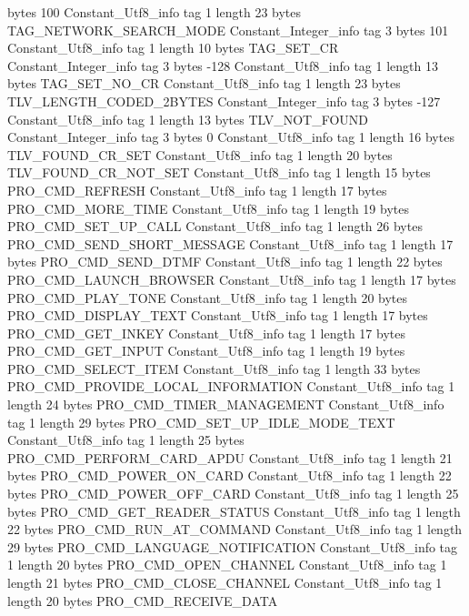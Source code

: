 {{{			bytes	100
		}
		Constant_Utf8_info {
			tag	1
			length	23
			bytes	TAG_NETWORK_SEARCH_MODE
		}
		Constant_Integer_info {
			tag	3
			bytes	101
		}
		Constant_Utf8_info {
			tag	1
			length	10
			bytes	TAG_SET_CR
		}
		Constant_Integer_info {
			tag	3
			bytes	-128
		}
		Constant_Utf8_info {
			tag	1
			length	13
			bytes	TAG_SET_NO_CR
		}
		Constant_Utf8_info {
			tag	1
			length	23
			bytes	TLV_LENGTH_CODED_2BYTES
		}
		Constant_Integer_info {
			tag	3
			bytes	-127
		}
		Constant_Utf8_info {
			tag	1
			length	13
			bytes	TLV_NOT_FOUND
		}
		Constant_Integer_info {
			tag	3
			bytes	0
		}
		Constant_Utf8_info {
			tag	1
			length	16
			bytes	TLV_FOUND_CR_SET
		}
		Constant_Utf8_info {
			tag	1
			length	20
			bytes	TLV_FOUND_CR_NOT_SET
		}
		Constant_Utf8_info {
			tag	1
			length	15
			bytes	PRO_CMD_REFRESH
		}
		Constant_Utf8_info {
			tag	1
			length	17
			bytes	PRO_CMD_MORE_TIME
		}
		Constant_Utf8_info {
			tag	1
			length	19
			bytes	PRO_CMD_SET_UP_CALL
		}
		Constant_Utf8_info {
			tag	1
			length	26
			bytes	PRO_CMD_SEND_SHORT_MESSAGE
		}
		Constant_Utf8_info {
			tag	1
			length	17
			bytes	PRO_CMD_SEND_DTMF
		}
		Constant_Utf8_info {
			tag	1
			length	22
			bytes	PRO_CMD_LAUNCH_BROWSER
		}
		Constant_Utf8_info {
			tag	1
			length	17
			bytes	PRO_CMD_PLAY_TONE
		}
		Constant_Utf8_info {
			tag	1
			length	20
			bytes	PRO_CMD_DISPLAY_TEXT
		}
		Constant_Utf8_info {
			tag	1
			length	17
			bytes	PRO_CMD_GET_INKEY
		}
		Constant_Utf8_info {
			tag	1
			length	17
			bytes	PRO_CMD_GET_INPUT
		}
		Constant_Utf8_info {
			tag	1
			length	19
			bytes	PRO_CMD_SELECT_ITEM
		}
		Constant_Utf8_info {
			tag	1
			length	33
			bytes	PRO_CMD_PROVIDE_LOCAL_INFORMATION
		}
		Constant_Utf8_info {
			tag	1
			length	24
			bytes	PRO_CMD_TIMER_MANAGEMENT
		}
		Constant_Utf8_info {
			tag	1
			length	29
			bytes	PRO_CMD_SET_UP_IDLE_MODE_TEXT
		}
		Constant_Utf8_info {
			tag	1
			length	25
			bytes	PRO_CMD_PERFORM_CARD_APDU
		}
		Constant_Utf8_info {
			tag	1
			length	21
			bytes	PRO_CMD_POWER_ON_CARD
		}
		Constant_Utf8_info {
			tag	1
			length	22
			bytes	PRO_CMD_POWER_OFF_CARD
		}
		Constant_Utf8_info {
			tag	1
			length	25
			bytes	PRO_CMD_GET_READER_STATUS
		}
		Constant_Utf8_info {
			tag	1
			length	22
			bytes	PRO_CMD_RUN_AT_COMMAND
		}
		Constant_Utf8_info {
			tag	1
			length	29
			bytes	PRO_CMD_LANGUAGE_NOTIFICATION
		}
		Constant_Utf8_info {
			tag	1
			length	20
			bytes	PRO_CMD_OPEN_CHANNEL
		}
		Constant_Utf8_info {
			tag	1
			length	21
			bytes	PRO_CMD_CLOSE_CHANNEL
		}
		Constant_Utf8_info {
			tag	1
			length	20
			bytes	PRO_CMD_RECEIVE_DATA
}}}

